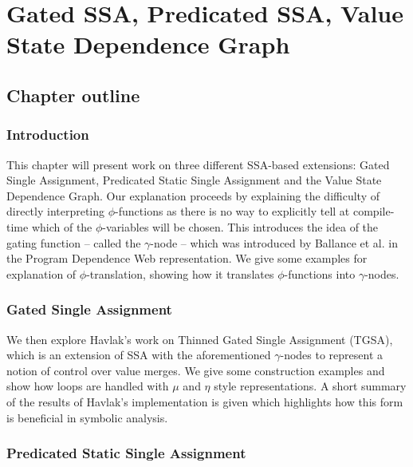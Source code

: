 \chapter{Gated SSA, Predicated SSA, Value State Dependence Graph }


\section*{Chapter outline}

\subsection*{Introduction}

This chapter will present work on three different SSA-based extensions: Gated Single Assignment, Predicated Static Single Assignment and the Value State Dependence Graph. Our explanation proceeds by explaining the difficulty of directly interpreting $\phi$-functions as there is no way to explicitly tell at compile-time which of the $\phi$-variables will be chosen. This introduces the idea of the gating function -- called the $\gamma$-node -- which was introduced by Ballance et al. in the Program Dependence Web\cite{207115} representation. We give some examples for explanation of $\phi$-translation, showing how it translates $\phi$-functions into $\gamma$-nodes.

\subsection*{Gated Single Assignment}

We then explore Havlak's work\cite{Havlak93constructionof} on Thinned Gated Single Assignment (TGSA), which is an extension of SSA with the aforementioned $\gamma$-nodes to represent a notion of control over value merges. We give some construction examples and show how loops are handled with $\mu$ and $\eta$ style representations. A short summary of the results of Havlak's implementation is given which highlights how this form is beneficial in symbolic analysis.

\subsection*{Predicated Static Single Assignment}

